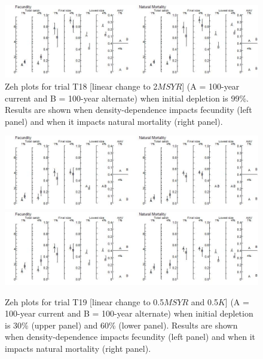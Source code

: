 \documentclass{article}\usepackage[]{graphicx}\usepackage[]{color}
\providecommand\phantomsection{}
\begin{document}
\begin{landscape}
\begin{figure}[H]
\centering
\includegraphics[]{SC66aRMP10_Part2_T18-D.jpeg}
\caption{
Zeh plots for trial T18
[linear change to 2$MSYR$]
(A = 100-year current and B = 100-year alternate)
when initial depletion is 99\%.
Results are shown when density-dependence impacts fecundity (left panel) and when it impacts natural mortality (right panel).
}
\end{figure}

\clearpage
\phantomsection
{}
\setcounter{figure}{0}


\begin{figure}[H]
\centering
\includegraphics[]{SC66aRMP10_Part2_T19-R.jpeg}
\includegraphics[]{SC66aRMP10_Part2_T19-S.jpeg}
\caption{
Zeh plots for trial T19
[linear change to 0.5$MSYR$ and 0.5$K$]
(A = 100-year current and B = 100-year alternate)
when initial depletion is 30\% (upper panel) and 60\% (lower panel).
Results are shown when density-dependence impacts fecundity (left panel) and when it impacts natural mortality (right panel).
}
\end{figure}




\end{landscape}
\end{document}
